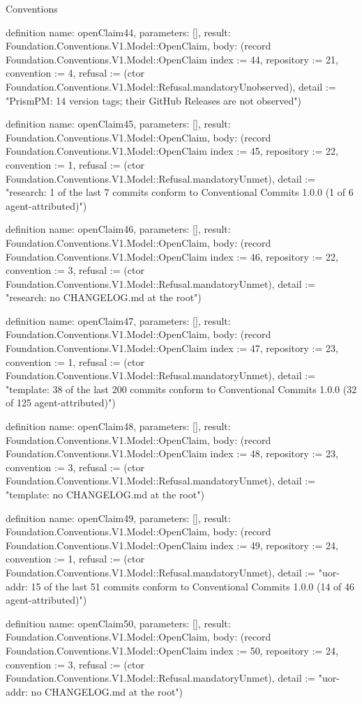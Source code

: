\begin{lexlean}{Conventions}
\begin{semanticmodule}
definition{
  name: openClaim44,
  parameters: [],
  result: Foundation.Conventions.V1.Model::OpenClaim,
  body: (record Foundation.Conventions.V1.Model::OpenClaim {index := 44, repository := 21, convention := 4, refusal := (ctor Foundation.Conventions.V1.Model::Refusal.mandatoryUnobserved), detail := "PrismPM: 14 version tags; their GitHub Releases are not observed"})
}

definition{
  name: openClaim45,
  parameters: [],
  result: Foundation.Conventions.V1.Model::OpenClaim,
  body: (record Foundation.Conventions.V1.Model::OpenClaim {index := 45, repository := 22, convention := 1, refusal := (ctor Foundation.Conventions.V1.Model::Refusal.mandatoryUnmet), detail := "research: 1 of the last 7 commits conform to Conventional Commits 1.0.0 (1 of 6 agent-attributed)"})
}

definition{
  name: openClaim46,
  parameters: [],
  result: Foundation.Conventions.V1.Model::OpenClaim,
  body: (record Foundation.Conventions.V1.Model::OpenClaim {index := 46, repository := 22, convention := 3, refusal := (ctor Foundation.Conventions.V1.Model::Refusal.mandatoryUnmet), detail := "research: no CHANGELOG.md at the root"})
}

definition{
  name: openClaim47,
  parameters: [],
  result: Foundation.Conventions.V1.Model::OpenClaim,
  body: (record Foundation.Conventions.V1.Model::OpenClaim {index := 47, repository := 23, convention := 1, refusal := (ctor Foundation.Conventions.V1.Model::Refusal.mandatoryUnmet), detail := "template: 38 of the last 200 commits conform to Conventional Commits 1.0.0 (32 of 125 agent-attributed)"})
}

definition{
  name: openClaim48,
  parameters: [],
  result: Foundation.Conventions.V1.Model::OpenClaim,
  body: (record Foundation.Conventions.V1.Model::OpenClaim {index := 48, repository := 23, convention := 3, refusal := (ctor Foundation.Conventions.V1.Model::Refusal.mandatoryUnmet), detail := "template: no CHANGELOG.md at the root"})
}

definition{
  name: openClaim49,
  parameters: [],
  result: Foundation.Conventions.V1.Model::OpenClaim,
  body: (record Foundation.Conventions.V1.Model::OpenClaim {index := 49, repository := 24, convention := 1, refusal := (ctor Foundation.Conventions.V1.Model::Refusal.mandatoryUnmet), detail := "uor-addr: 15 of the last 51 commits conform to Conventional Commits 1.0.0 (14 of 46 agent-attributed)"})
}

definition{
  name: openClaim50,
  parameters: [],
  result: Foundation.Conventions.V1.Model::OpenClaim,
  body: (record Foundation.Conventions.V1.Model::OpenClaim {index := 50, repository := 24, convention := 3, refusal := (ctor Foundation.Conventions.V1.Model::Refusal.mandatoryUnmet), detail := "uor-addr: no CHANGELOG.md at the root"})
}


\end{semanticmodule}
\end{lexlean}
